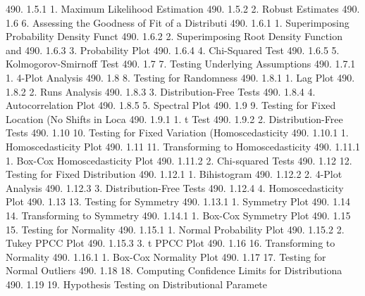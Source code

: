490.      1.5.1                       1. Maximum Likelihood Estimation
490.      1.5.2                       2. Robust Estimates
490.      1.6                   6. Assessing the Goodness of Fit of a Distributi
490.      1.6.1                       1. Superimposing Probability Density Funct
490.      1.6.2                       2. Superimposing Root Density Function and
490.      1.6.3                       3. Probability Plot
490.      1.6.4                       4. Chi-Squared Test
490.      1.6.5                       5. Kolmogorov-Smirnoff Test
490.      1.7                   7. Testing Underlying Assumptions
490.      1.7.1                       1. 4-Plot Analysis
490.      1.8                   8. Testing for Randomness
490.      1.8.1                       1. Lag Plot
490.      1.8.2                       2. Runs Analysis
490.      1.8.3                       3. Distribution-Free Tests
490.      1.8.4                       4. Autocorrelation Plot
490.      1.8.5                       5. Spectral Plot
490.      1.9                   9. Testing for Fixed Location (No Shifts in Loca
490.      1.9.1                       1. t Test
490.      1.9.2                       2. Distribution-Free Tests
490.      1.10                 10. Testing for Fixed Variation (Homoscedasticity
490.      1.10.1                      1. Homoscedasticity Plot
490.      1.11                 11. Transforming to Homoscedasticity
490.      1.11.1                      1. Box-Cox Homoscedasticity Plot
490.      1.11.2                      2. Chi-squared Tests
490.      1.12                 12. Testing for Fixed Distribution
490.      1.12.1                      1. Bihistogram
490.      1.12.2                      2. 4-Plot Analysis
490.      1.12.3                      3. Distribution-Free Tests
490.      1.12.4                      4. Homoscedasticity Plot
490.      1.13                 13. Testing for Symmetry
490.      1.13.1                      1. Symmetry Plot
490.      1.14                 14. Transforming to Symmetry
490.      1.14.1                      1. Box-Cox Symmetry Plot
490.      1.15                 15. Testing for Normality
490.      1.15.1                      1. Normal Probability Plot
490.      1.15.2                      2. Tukey PPCC Plot
490.      1.15.3                      3. t PPCC Plot
490.      1.16                 16. Transforming to Normality
490.      1.16.1                      1. Box-Cox Normality Plot
490.      1.17                 17. Testing for Normal Outliers
490.      1.18                 18. Computing Confidence Limits for Distributiona
490.      1.19                 19. Hypothesis Testing on Distributional Paramete
